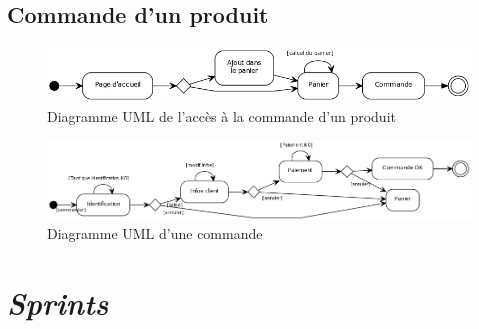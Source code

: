 \documentclass[12pt]{article}
\begin{document}
\subsection{Commande d'un produit}

\begin{figure}[ht]
    \center
    \includegraphics[scale=0.55]{../Diagrams/ActivityDiagrams/commande_global.png}
    \caption*{Diagramme UML de l'accès à la commande d'un produit}
\end{figure}

\begin{figure}[ht]
    \center
    \includegraphics[scale=0.45]{../Diagrams/ActivityDiagrams/commande_en_cours.png}
    \caption*{Diagramme UML d'une commande}
\end{figure}

\newpage
\section{\textit{Sprints}}
\end{document}
